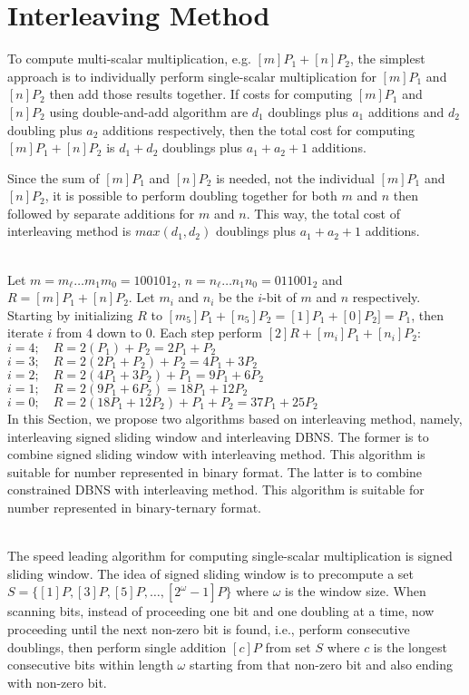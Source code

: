 \newpage
\section{Interleaving Method}
To compute multi-scalar multiplication, e.g. $[m]P_1+[n]P_2$,
the simplest approach is to individually perform single-scalar multiplication
for $[m]P_1$ and $[n]P_2$ then add those results together.
If costs for computing $[m]P_1$ and $[n]P_2$ using double-and-add algorithm are
$d_1$ doublings plus $a_1$ additions and $d_2$ doubling plus $a_2$ additions respectively,
then the total cost for computing $[m]P_1 + [n]P_2$ is $d_1 + d_2$ doublings plus $a_1 + a_2 + 1$ additions.

Since the sum of $[m]P_1$ and $[n]P_2$ is needed, not the individual $[m]P_1$ and $[n]P_2$,
it is possible to perform doubling together for both $m$ and $n$
then followed by separate additions for $m$ and $n$.
This way, the total cost of interleaving method is $max(d_1,d_2)$ doublings plus $a_1 + a_2 + 1$ additions.

 \\
Let $m = m_\ell \dots m_1 m_0 = {100101}_2$, $n = n_\ell \dots n_1 n_0 = {011001}_2$ and $R = [m]P_1 + [n]P_2$.
Let $m_i$ and $n_i$ be the $i$-bit of $m$ and $n$ respectively.
Starting by initializing $R$ to $[m_5]P_1 + [n_5]P_2 = [1]P_1 + [0]P_2] = P_1$, then iterate $i$ from $4$ down to $0$.
Each step perform $[2]R + [m_i]P_1 + [n_i]P_2$: \\
$i=4; \quad R = 2(P_1) + P_2 = 2P_1 + P_2$ \\
$i=3; \quad R = 2(2P_1 + P_2) + P_2 = 4P_1 + 3P_2$ \\
$i=2; \quad R = 2(4P_1 + 3P_2) + P_1 = 9P_1 + 6P_2$ \\
$i=1; \quad R = 2(9P_1 + 6P_2) = 18P_1 + 12P_2$ \\
$i=0; \quad R = 2(18P_1 + 12P_2) + P_1 + P_2 = 37P_1 + 25P_2$ \\

In this Section, we propose two algorithms based on interleaving method,
namely, interleaving signed sliding window and interleaving DBNS.
The former is to combine signed sliding window with interleaving method.
This algorithm is suitable for number represented in binary format.
The latter is to combine constrained DBNS with interleaving method.
This algorithm is suitable for number represented in binary-ternary format.



 \\
\label{sec:signedslide}
The speed leading algorithm for computing single-scalar multiplication is signed sliding window.
The idea of signed sliding window is to precompute a set $S = \{[1]P, [3]P, [5]P, \dots, [2^{\omega}-1]P\}$ where $\omega$ is the window size.
When scanning bits, instead of proceeding one bit and one doubling at a time,
now proceeding until the next non-zero bit is found, i.e., perform consecutive doublings,
then perform single addition $[c]P$ from set $S$ where $c$ is the longest consecutive bits within length $\omega$
starting from that non-zero bit and also ending with non-zero bit.

